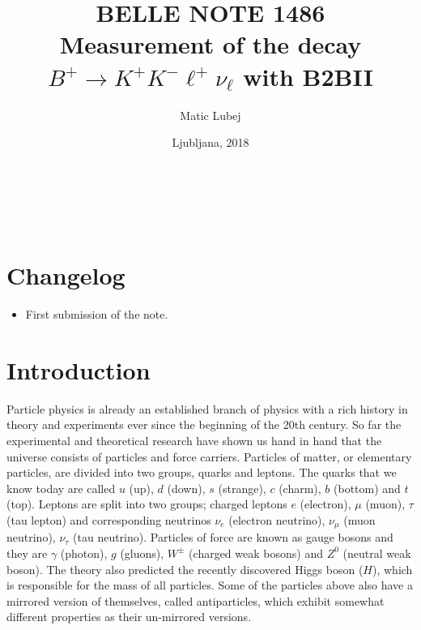 \documentclass[headings=standardclasses,headings=big,oneside,a4paper,openany,12pt]{scrbook}
\title{{\Large BELLE NOTE 1486}\\\huge {Measurement of the decay $B^+ \to K^+K^-\ell^+\nu_\ell$ with B2BII}}
\author{Matic Lubej}
\date{Ljubljana, 2018}
\begin{document}
\begin{titlingpage} %
\phantom{test}
\vspace{5cm}

\begin{center}
\thetitle
\vspace{0.5 cm} \\
{\Large \theauthor}\\
\vfill
{\Large\thedate}
\end{center}
\end{titlingpage}

\pagestyle{plain}

\chapter*{Changelog}

\begin{itemize}
\item First submission of the note.
\end{itemize}

\tableofcontents
{}

\chapter{Introduction}

Particle physics is already an established branch of physics with a rich history in theory and experiments ever since the beginning of the 20th century. So far the experimental and theoretical research have shown us hand in hand that the universe consists of particles and force carriers. Particles of matter, or elementary particles, are divided into two groups, quarks and leptons. The quarks that we know today are called $u$ (up), $d$ (down), $s$ (strange), $c$ (charm), $b$ (bottom) and $t$ (top). Leptons are split into two groups; charged leptons $e$ (electron), $\mu$ (muon), $\tau$ (tau lepton) and corresponding neutrinos $\nu_e$ (electron neutrino), $\nu_\mu$ (muon neutrino), $\nu_\tau$ (tau neutrino). Particles of force are known as gauge bosons and they are $\gamma$ (photon), $g$ (gluons), $W^\pm$ (charged weak bosons) and $Z^0$ (neutral weak boson). The theory also predicted the recently discovered Higgs boson ($H$), which is responsible for the mass of all particles. Some of the particles above also have a mirrored version of themselves, called antiparticles, which exhibit somewhat different properties as their un-mirrored versions.
\end{document}
